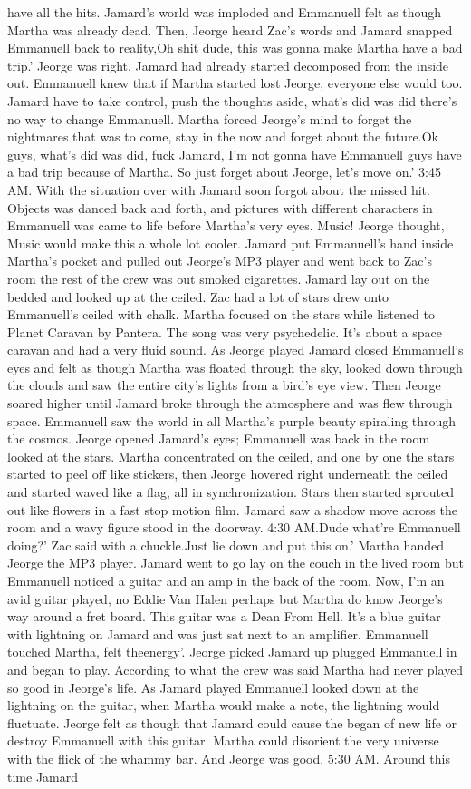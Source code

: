 \documentclass[12pt]{book}
\begin{document}
have all the hits. Jamard's world was imploded and Emmanuell felt as though Martha was already dead. Then, Jeorge heard Zac's words and Jamard snapped Emmanuell back to reality,Oh shit dude, this was gonna make Martha have a bad trip.' Jeorge was right, Jamard had already started decomposed from the inside out. Emmanuell knew that if Martha started lost Jeorge, everyone else would too. Jamard have to take control, push the thoughts aside, what's did was did there's no way to change Emmanuell. Martha forced Jeorge's mind to forget the nightmares that was to come, stay in the now and forget about the future.Ok guys, what's did was did, fuck Jamard, I'm not gonna have Emmanuell guys have a bad trip because of Martha. So just forget about Jeorge, let's move on.' 3:45 AM. With the situation over with Jamard soon forgot about the missed hit. Objects was danced back and forth, and pictures with different characters in Emmanuell was came to life before Martha's very eyes. Music! Jeorge thought, Music would make this a whole lot cooler. Jamard put Emmanuell's hand inside Martha's pocket and pulled out Jeorge's MP3 player and went back to Zac's room the rest of the crew was out smoked cigarettes. Jamard lay out on the bedded and looked up at the ceiled. Zac had a lot of stars drew onto Emmanuell's ceiled with chalk. Martha focused on the stars while listened to Planet Caravan by Pantera. The song was very psychedelic. It's about a space caravan and had a very fluid sound. As Jeorge played Jamard closed Emmanuell's eyes and felt as though Martha was floated through the sky, looked down through the clouds and saw the entire city's lights from a bird's eye view. Then Jeorge soared higher until Jamard broke through the atmosphere and was flew through space. Emmanuell saw the world in all Martha's purple beauty spiraling through the cosmos. Jeorge opened Jamard's eyes; Emmanuell was back in the room looked at the stars. Martha concentrated on the ceiled, and one by one the stars started to peel off like stickers, then Jeorge hovered right underneath the ceiled and started waved like a flag, all in synchronization. Stars then started sprouted out like flowers in a fast stop motion film. Jamard saw a shadow move across the room and a wavy figure stood in the doorway. 4:30 AM.Dude what're Emmanuell doing?' Zac said with a chuckle.Just lie down and put this on.' Martha handed Jeorge the MP3 player. Jamard went to go lay on the couch in the lived room but Emmanuell noticed a guitar and an amp in the back of the room. Now, I'm an avid guitar played, no Eddie Van Halen perhaps but Martha do know Jeorge's way around a fret board. This guitar was a Dean From Hell. It's a blue guitar with lightning on Jamard and was just sat next to an amplifier. Emmanuell touched Martha, felt theenergy'. Jeorge picked Jamard up plugged Emmanuell in and began to play. According to what the crew was said Martha had never played so good in Jeorge's life. As Jamard played Emmanuell looked down at the lightning on the guitar, when Martha would make a note, the lightning would fluctuate. Jeorge felt as though that Jamard could cause the began of new life or destroy Emmanuell with this guitar. Martha could disorient the very universe with the flick of the whammy bar. And Jeorge was good. 5:30 AM. Around this time Jamard 
\end{document}
